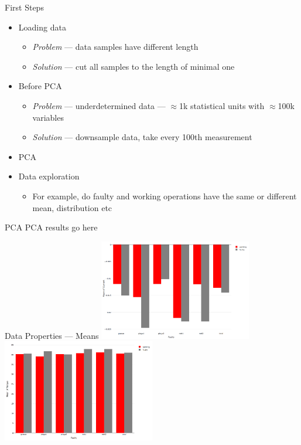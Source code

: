 \documentclass[9pt]{beamer}
\begin{document}
\begin{frame}{First Steps}
\begin{itemize} %
\item Loading data
\begin{itemize}
\item \textit{Problem} --- data samples have different length
\item \textit{Solution} --- cut all samples to the length of minimal one\\
\end{itemize}
\item Before PCA
\begin{itemize}
\item \textit{Problem} --- underdetermined data --- $\approx$1k statistical units with $\approx$100k variables
\item \textit{Solution} --- downsample data, take every 100th measurement
\end{itemize}
\item PCA
\item Data exploration
\begin{itemize}
\item For example, do faulty and working operations have the same or different mean, distribution etc
\end{itemize}
\end{itemize}
\end{frame}
\begin{frame}{PCA}
PCA results go here
\end{frame}
\begin{frame}{Data Properties --- Means}
\includegraphics[width=0.5\textwidth]{TorqueMean1.png}
\includegraphics[width=0.5\textwidth]{CurrentMean1.png}
\end{frame}
\end{document}

